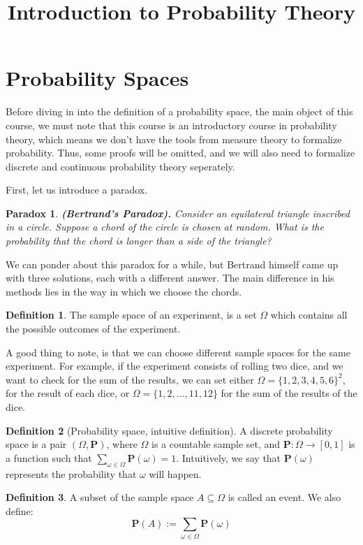 \documentclass[11pt,a4paper]{article}
\title{\textbf{Introduction to Probability Theory}}
\author{}
\date{}
\theoremstyle{definition}
\newtheorem{definition}{Definition}[section]
\theoremstyle{plain}
\newtheorem{paradox}{Paradox}[section]
\renewcommand{\tt}[1]{\textnormal{\textbf{(#1).}}} %
\begin{document}
	\maketitle
	\newpage
  \section{Probability Spaces}
  Before diving in into the definition of a probability space, the main object
  of this course, we must note that this course is an introductory course in 
  probability theory, which means we don't have the tools from measure theory
  to formalize probability. Thus, some proofs will be omitted, and we will
  also need to formalize discrete and continuous probability theory seperately.

  First, let us introduce a paradox.
  \begin{paradox}
    \tt{Bertrand's Paradox}
    Consider an equilateral triangle inscribed in a circle. 
    Suppose a chord of the circle is chosen at random. 
    What is the probability that the chord is longer than a side of the 
    triangle? 
  \end{paradox}

  We can ponder about this paradox for a while, but Bertrand himself came up
  with three solutions, each with a different answer. The main difference in
  his methods lies in the way in which we choose the chords.

  \begin{definition}
    The sample space of an experiment, is a set $\Omega$ which contains all
    the possible outcomes of the experiment.
  \end{definition}

  A good thing to note, is that we can choose different sample spaces for the
  same experiment. For example, if the experiment consists of rolling two
  dice, and we want to check for the sum of the results, we can set either
  $\Omega = \{1,2,3,4,5,6\}^2$, for the result of each dice, or 
  $\Omega = \{1,2,\dots,11,12\}$ for the sum of the results of the dice. 

  \begin{definition}[Probability space, intuitive definition]
    A discrete probability space is a pair $(\Omega, \mathbf P)$, where
    $\Omega$ is a countable sample set, and $\mathbf P \colon \Omega \to 
    [0,1]$ is a function such that 
    $\sum_{\omega \in \Omega}{\mathbf P(\omega)} = 1$. 
    Intuitively, we say that $\mathbf P(\omega)$ represents the probability
    that $\omega$ will happen.
  \end{definition}
  \begin{definition}
    A subset of the sample space $A \subseteq \Omega$ is called an event.
    We also define:
    \[
      \mathbf P(A) := \sum_{\omega \in \Omega}{\mathbf P(\omega)}
    \]
  \end{definition}
  
\end{document}

